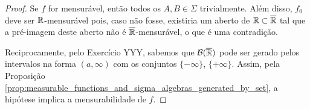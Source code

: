 \begin{proof}
    Se $f$ for mensurável, então todos os $A,B\in\Sigma$ trivialmente. Além disso, $f_0$ deve ser $\mathbb{R}$-mensurável pois, caso não fosse, existiria um aberto de $\mathbb{R}\subset \overline{\mathbb{R}}$ tal que a pré-imagem deste aberto não é $\overline{\mathbb{R}}$-mensurável, o que é uma contradição.
    
    Reciprocamente, pelo Exercício YYY, sabemos que $\mathcal{B}(\overline{\mathbb{R}})$ pode ser gerado pelos intervalos na forma $(a,\infty)$ com os conjuntos $\{-\infty\}$, $\{+\infty\}$. Assim, pela Proposição \ref{prop:measurable_functions_and_sigma_algebras_generated_by_set}, a hipótese implica a mensurabilidade de $f$. 
\end{proof}